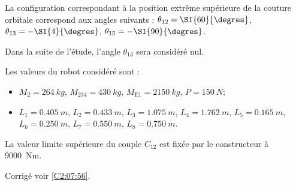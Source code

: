 \ifprof
\else
\fi


La configuration correspondant à la position extrême supérieure de la couture orbitale correspond aux angles suivants : $\theta_{12}=\SI{60}{\degres}$, $\theta_{13}=-\SI{4}{\degres}$, $\theta_{15}=-\SI{90}{\degres}$.

Dans la suite de l'étude, l'angle $\theta_{13}$ sera considéré nul.

\ifprof
\else
\fi

Les valeurs du robot considéré sont :
\begin{itemize}
\item $M_{2}=\SI{264}{kg}$, $M_{234}=\SI{430}{kg}$, $M_{\text{E1}}=\SI{2150}{kg}$, $P=\SI{150}{N}$;
\item $L_{1}=\SI{0,405}{m}$, $L_{2}=\SI{0,433}{m}$, $L_{3}=\SI{1,075}{m}$, $L_{4}=\SI{1,762}{m}$, $L_{5}=\SI{0,165}{m}$, $L_{6}=\SI{0,250}{m}$, $L_{7}=\SI{0,550}{m}$, $L_{8}=\SI{0,750}{m}$.
\end{itemize}

\ifprof
\else
\fi


La valeur limite supérieure du couple $C_{12}$ est fixée par le constructeur à \SI{9000}{Nm}.

\ifprof
\else
\fi







\ifprof
\else
\begin{flushright}
\footnotesize{Corrigé  voir \ref{C2:07:56}.}
\end{flushright}%
\fi 